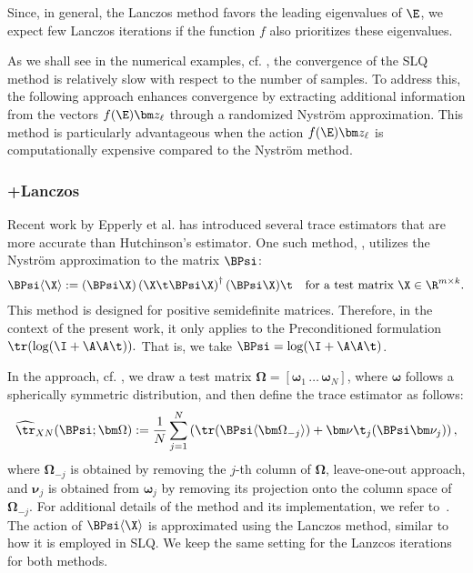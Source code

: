 \documentclass{aims} %
\theoremstyle{definition}
\begin{document}
Since, in general,  the Lanczos method favors the leading  eigenvalues of  $\E$, 
 we expect few Lanczos iterations if the function $f$ also prioritizes these eigenvalues.



As we shall see in the numerical examples, cf. ,  the convergence of the SLQ 
method is relatively slow with respect to the number of samples.
To address this, the following approach enhances convergence by extracting additional information from the vectors  $f(\E) \bm z_\ell$ through a randomized Nyström approximation.
This method is particularly advantageous when the action  $f(\E) \bm z_\ell$
is computationally expensive compared to the Nyström method. 



\subsubsection*{\xntrace{}+Lanczos}

Recent work by Epperly et al. \cite{Epperly_2024}  has introduced several trace estimators that are more accurate than Hutchinson's estimator. One such method, \xntrace{}, utilizes the Nyström approximation to the matrix $\BPsi$:
\begin{align}
\BPsi\langle \X \rangle := (\BPsi\X) \left( \X\t \BPsi\X \right)^\dagger (\BPsi\X)\t \quad \text{for a test matrix } \X \in \R^{m \times k}.
\end{align}
%
This method is designed for positive semidefinite matrices. Therefore, in the context of the present work, it only applies to the Preconditioned formulation $\tr(\log(\I + \A\A\t)).$ That is, we take $\BPsi =  \log(\I + \A\A\t)$.



In the  \xntrace{} approach, cf. \cite[Section 2.3]{Epperly_2024}, we draw a test matrix $\bm{\Omega} = [\bm \omega_1 \,\dots\, \bm\omega_N]$, where
$\bm \omega$  follows a  spherically symmetric distribution, 
and then  define the trace estimator as follows:
\begin{align*}
   \widehat{\tr}_{XN}(\BPsi;\bm \Omega) :=\frac{1}{N}\sum_{j=1}^N
   \left(
   \tr (\BPsi \langle \bm \Omega_{-j} \rangle) +\bm \nu\t_j(\BPsi   \bm \nu_j)\right),
\end{align*}
where 
$\bm \Omega_{-j} $ is obtained by removing the $j$-th column of  $\bm \Omega$, leave-one-out approach, and $\bm \nu_j$ is obtained from  $\bm \omega_j$  by removing its projection onto the column space of  $\bm \Omega_{-j}$. For additional details of the method and its implementation, we refer to~\cite[Section 2.2]{Epperly_2024}. 
The action of $\BPsi\langle\X\rangle$ is approximated using the Lanczos method, similar to how it is employed in SLQ. We keep the same setting for the Lanzcos iterations for both methods. 
\end{document}
